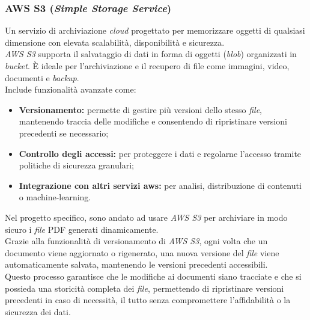 \subsubsection{AWS S3 (\textit{Simple Storage Service})}

Un servizio di archiviazione \textit{cloud} progettato per memorizzare oggetti di qualsiasi dimensione con elevata scalabilità, disponibilità e sicurezza.\\
\textit{AWS S3} supporta il salvataggio di dati in forma di oggetti (\textit{blob}) organizzati in \textit{bucket}. È ideale per l’archiviazione e il recupero di file come immagini, video, documenti e \textit{backup}.\\

\noindent Include funzionalità avanzate come:
\begin{itemize}
    \item \textbf{Versionamento:} permette di gestire più versioni dello stesso \textit{file}, mantenendo traccia delle modifiche e consentendo di ripristinare versioni precedenti se necessario;
    \item \textbf{Controllo degli accessi:} per proteggere i dati e regolarne l'accesso tramite politiche di sicurezza granulari;
    \item \textbf{Integrazione con altri servizi \gls{aws}:} per analisi, distribuzione di contenuti o \gls{machine-learning}.
\end{itemize}

\noindent Nel progetto specifico, sono andato ad usare \textit{AWS S3} per archiviare in modo sicuro i \textit{file} PDF generati dinamicamente.\\
Grazie alla funzionalità di versionamento di \textit{AWS S3}, ogni volta che un documento viene aggiornato o rigenerato, una nuova versione del \textit{file} viene automaticamente salvata, mantenendo le versioni precedenti accessibili.\\
Questo processo garantisce che le modifiche ai documenti siano tracciate e che si possieda una storicità completa dei \textit{file}, permettendo di ripristinare versioni precedenti in caso di necessità, il tutto senza compromettere l'affidabilità o la sicurezza dei dati.